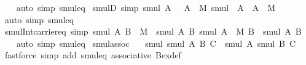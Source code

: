 \begin{isabellebody}
%
\isadelimproof
\ \ %
\endisadelimproof
%
\isatagproof
{}\isamarkupfalse%
\ {\isacharparenleft}{\kern0pt}auto\ simp{\isacharcolon}{\kern0pt}\ smul{\isacharunderscore}{\kern0pt}eq{\isacharparenright}{\kern0pt}%
\endisatagproof
{\isafoldproof}%
%
\isadelimproof
\isanewline
%
\endisadelimproof
\isanewline
{}\isamarkupfalse%
\ smul{\isacharunderscore}{\kern0pt}D\ {\isacharbrackleft}{\kern0pt}simp{\isacharbrackright}{\kern0pt}{\isacharcolon}{\kern0pt}\ {\isachardoublequoteopen}smul\ A\ {\isacharbraceleft}{\kern0pt}{\isasymone}{\isacharbraceright}{\kern0pt}\ {\isacharequal}{\kern0pt}\ A\ {\isasyminter}\ M{\isachardoublequoteclose}\ {\isachardoublequoteopen}smul\ {\isacharbraceleft}{\kern0pt}{\isasymone}{\isacharbraceright}{\kern0pt}\ A\ {\isacharequal}{\kern0pt}\ A\ {\isasyminter}\ M{\isachardoublequoteclose}\isanewline
%
\isadelimproof
\ \ %
\endisadelimproof
%
\isatagproof
{}\isamarkupfalse%
\ {\isacharparenleft}{\kern0pt}auto\ simp{\isacharcolon}{\kern0pt}\ smul{\isacharunderscore}{\kern0pt}eq{\isacharparenright}{\kern0pt}%
\endisatagproof
{\isafoldproof}%
%
\isadelimproof
\isanewline
%
\endisadelimproof
\isanewline
{}\isamarkupfalse%
\ smul{\isacharunderscore}{\kern0pt}Int{\isacharunderscore}{\kern0pt}carrier{\isacharunderscore}{\kern0pt}eq\ {\isacharbrackleft}{\kern0pt}simp{\isacharbrackright}{\kern0pt}{\isacharcolon}{\kern0pt}\ {\isachardoublequoteopen}smul\ A\ {\isacharparenleft}{\kern0pt}B\ {\isasyminter}\ M{\isacharparenright}{\kern0pt}\ {\isacharequal}{\kern0pt}\ smul\ A\ B{\isachardoublequoteclose}\ {\isachardoublequoteopen}smul\ {\isacharparenleft}{\kern0pt}A\ {\isasyminter}\ M{\isacharparenright}{\kern0pt}\ B\ {\isacharequal}{\kern0pt}\ smul\ A\ B{\isachardoublequoteclose}\isanewline
%
\isadelimproof
\ \ %
\endisadelimproof
%
\isatagproof
{}\isamarkupfalse%
\ {\isacharparenleft}{\kern0pt}auto\ simp{\isacharcolon}{\kern0pt}\ smul{\isacharunderscore}{\kern0pt}eq{\isacharparenright}{\kern0pt}%
\endisatagproof
{\isafoldproof}%
%
\isadelimproof
\isanewline
%
\endisadelimproof
\isanewline
{}\isamarkupfalse%
\ smul{\isacharunderscore}{\kern0pt}assoc{\isacharcolon}{\kern0pt}\isanewline
\ \ \ {\isachardoublequoteopen}smul\ {\isacharparenleft}{\kern0pt}smul\ A\ B{\isacharparenright}{\kern0pt}\ C\ {\isacharequal}{\kern0pt}\ smul\ A\ {\isacharparenleft}{\kern0pt}smul\ B\ C{\isacharparenright}{\kern0pt}{\isachardoublequoteclose}\isanewline
%
\isadelimproof
\ \ %
\endisadelimproof
%
\isatagproof
{}\isamarkupfalse%
\ {\isacharparenleft}{\kern0pt}fastforce\ simp\ add{\isacharcolon}{\kern0pt}\ smul{\isacharunderscore}{\kern0pt}eq\ associative\ Bex{\isacharunderscore}{\kern0pt}def{\isacharparenright}{\kern0pt}%

\end{isabellebody}
